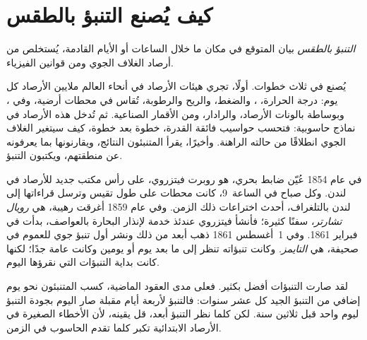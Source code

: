 \section{كيف يُصنع التنبؤ بالطقس}

\begin{definition}\label{def:g8:fronts-and-weather-maps:forecast}
\emph{التنبؤ بالطقس} بيان  المتوقع في مكان ما خلال
الساعات أو الأيام القادمة، يُستخلص من أرصاد الغلاف الجوي ومن قوانين
الفيزياء.
\end{definition}

يُصنع  في ثلاث خطوات. أولًا، تجري هيئات الأرصاد في أنحاء العالم
ملايين الأرصاد كل يوم: درجة الحرارة، ، والضغط، والريح والرطوبة،
تُقاس في محطات أرضية، وفي ، وبوساطة بالونات الأرصاد، والرادار، ومن
الأقمار الصناعية. ثم تُدخل هذه الأرصاد في نماذج حاسوبية: فتحسب حواسيب
فائقة القدرة، خطوة بعد خطوة، كيف سيتغير الغلاف الجوي انطلاقًا من حالته
الراهنة. وأخيرًا، يقرأ المتنبئون النتائج، ويقارنونها بما يعرفونه عن
منطقتهم، ويكتبون التنبؤ.

\begin{history}
في عام 1854 عُيّن ضابط بحري، هو روبرت فيتزروي، على رأس مكتب جديد للأرصاد في
لندن. وكل صباح في الساعة~9، كانت محطات على طول  تقيس  وترسل
قراءاتها إلى لندن بالتلغراف، أحدث اختراعات ذلك الزمن. وفي عام 1859 أغرقت
 رهيبة، هي  \emph{رويال تشارتر}، سفنًا كثيرة؛ فأنشأ فيتزروي عندئذ
خدمة لإنذار البحارة بالعواصف، بدأت في فبراير 1861. وفي
1~أغسطس 1861 ذهب أبعد من ذلك ونشر أول تنبؤ جوي للعموم في صحيفة،
هي \emph{التايمز}. وكانت تنبؤاته تنظر إلى ما بعد يوم أو يومين
وكانت عامة جدًا؛ لكنها كانت بداية التنبؤات التي نقرؤها اليوم.
\end{history}

لقد صارت التنبؤات أفضل بكثير. فعلى مدى العقود الماضية، كسب المتنبئون نحو يوم
إضافي من التنبؤ الجيد كل عشر سنوات: فالتنبؤ لأربعة أيام مقبلة صار اليوم بجودة
التنبؤ ليوم واحد قبل ثلاثين سنة. لكن كلما نظر التنبؤ أبعد، قل يقينه، لأن
الأخطاء الصغيرة في الأرصاد الابتدائية تكبر كلما تقدم الحاسوب في
الزمن.

